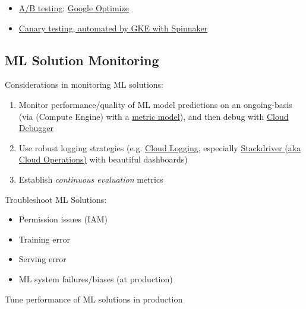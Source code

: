 \documentclass[10pt,landscape,letterpaper]{cheatsheet}
\begin{document}
\begin{multicols}{3}
\begin{itemize}
    \item \href{https://cloud.google.com/recommendations-ai/docs/a-b-testing}{A/B testing}: \href{https://optimize.withgoogle.com/}{Google Optimize}
    \item \href{https://cloud.google.com/solutions/automated-canary-analysis-kubernetes-engine-spinnaker}{Canary testing, automated by GKE with Spinnaker}
\end{itemize}

\subsection{ML Solution Monitoring}

Considerations in monitoring ML solutions:

\begin{enumerate}
    \item Monitor performance/quality of ML model predictions on an ongoing-basis (via  (Compute Engine) with a \href{https://cloud.google.com/monitoring/api/v3/metric-model}{metric model}), and then debug with \href{https://cloud.google.com/debugger}{Cloud Debugger}
    \item Use robust logging strategies (e.g. \href{https://cloud.google.com/logging}{Cloud Logging}, especially \href{https://cloud.google.com/products/operations}{Stackdriver (aka Cloud Operations)} with beautiful dashboards)
    \item Establish \textit{continuous evaluation} metrics
\end{enumerate}

Troubleshoot ML Solutions:

\begin{itemize}
    \item Permission issues (IAM)
    \item Training error
    \item Serving error
    \item ML system failures/biases (at production)
\end{itemize}

Tune performance of ML solutions in production


\end{multicols}
\end{document}
